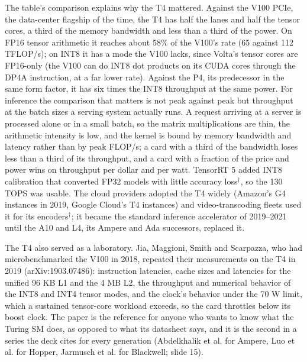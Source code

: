\documentclass[11pt,letterpaper]{article}
\begin{document}
The table's comparison explains why the T4 mattered. Against the V100 PCIe, the data-center flagship of the time, the T4 has half the lanes and half the tensor cores, a third of the memory bandwidth and less than a third of the power. On FP16 tensor arithmetic it reaches about 58\% of the V100's rate (65 against 112 TFLOP/s); on INT8 it has a mode the V100 lacks, since Volta's tensor cores are FP16-only (the V100 can do INT8 dot products on its CUDA cores through the DP4A instruction, at a far lower rate). Against the P4, its predecessor in the same form factor, it has six times the INT8 throughput at the same power. For inference the comparison that matters is not peak against peak but throughput at the batch sizes a serving system actually runs. A request arriving at a server is processed alone or in a small batch, so the matrix multiplications are thin, the arithmetic intensity is low, and the kernel is bound by memory bandwidth and latency rather than by peak FLOP/s; a card with a third of the bandwidth loses less than a third of its throughput, and a card with a fraction of the price and power wins on throughput per dollar and per watt. TensorRT 5 added INT8 calibration that converted FP32 models with little accuracy loss$^\dagger$, so the 130 TOPS was usable. The cloud providers adopted the T4 widely (Amazon's G4 instances in 2019, Google Cloud's T4 instances) and video-transcoding fleets used it for its encoders$^\dagger$; it became the standard inference accelerator of 2019--2021 until the A10 and L4, its Ampere and Ada successors, replaced it.

The T4 also served as a laboratory. Jia, Maggioni, Smith and Scarpazza, who had microbenchmarked the V100 in 2018, repeated their measurements on the T4 in 2019 (arXiv:1903.07486): instruction latencies, cache sizes and latencies for the unified 96 KB L1 and the 4 MB L2, the throughput and numerical behavior of the INT8 and INT4 tensor modes, and the clock's behavior under the 70 W limit, which a sustained tensor-core workload exceeds, so the card throttles below its boost clock. The paper is the reference for anyone who wants to know what the Turing SM does, as opposed to what its datasheet says, and it is the second in a series the deck cites for every generation (Abdelkhalik et al. for Ampere, Luo et al. for Hopper, Jarmusch et al. for Blackwell; slide 15).
\end{document}
